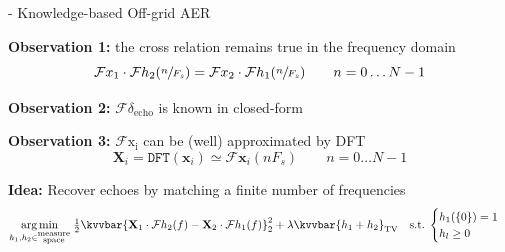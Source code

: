 \begin{frame}{\blaster - Knowledge-based Off-grid AER}

    \begin{block}{\textbf{Observation 1:} the cross relation remains true in the frequency domain}
        \begin{equation*}
            \mathcal{F}x_1 \cdot \mathcal{F}h_2 (\sfrac{n}{F_s}) = \mathcal{F}x_2 \cdot \mathcal{F}h_1(\sfrac{n}{F_s}) \qquad n=0\dots N-1
        \end{equation*}
        \end{block}

        \vspace{.5em}

        \pause
        \begin{block}{\textbf{Observation 2:} $\mathcal{F}\delta_{\mathrm{echo}}$ is known in closed-form}
        \end{block}

        \pause
        \vspace{1.em}
        \begin{block}{\textbf{Observation 3:} $\mathcal{F}{\mathrm{x_i}}$ can be (well) approximated by DFT}
        \begin{equation*}
            \mathbf{X}_i = \texttt{DFT}(\mathbf{x}_i) \simeq  \mathcal{F}{\mathbf{x}_i}(nF_s) \qquad n=0\dots N-1
        \end{equation*}
        \end{block}


        \pause
        \vfill
        \begin{block}{\textbf{Idea:} Recover echoes by matching a finite number of frequencies}
        \begin{equation*}
            \underset{h_1,h_2 \in \substack{\text{measure} \\ \text{space}}}{\arg\min} \;
            \tfrac{1}{2} \kvvbar{
                \mathbf{X}_1 \cdot \mathcal{F}h_2 (f) - \mathbf{X}_2 \cdot \mathcal{F}h_1(f)
            }_2^2
            + \lambda \kvvbar{h_1 + h_2}_{\mathrm{TV}}
            \quad
            \text{s.t.}\;
            \begin{cases}
                h_1(\{0\})=1 \\
                h_l \geq 0
                \end{cases}
        \end{equation*}
        \end{block}


\end{frame}
